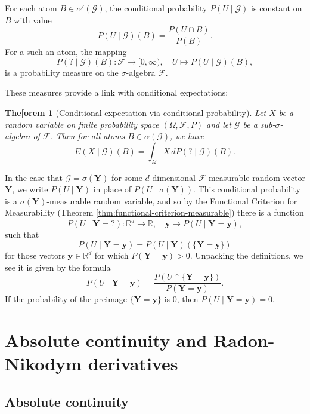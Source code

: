 \documentclass[11pt]{book}
\newtheorem{thm}{The[orem}[section]
\theoremstyle{definition}
\numberwithin{equation}{section}
\begin{document}
For each atom $B\in \alpha'(\mathcal{G})$, the conditional probability $P(U\mid \mathcal{G})$ is constant on $B$ with value
\[
	P(U\mid \mathcal{G})(B) = \frac{P(U\cap B)}{P(B)}.
\]
For a such an atom, the mapping
\[
	P({?}\mid \mathcal{G})(B): \mathcal{F} \to [0, \infty), \quad U \mapsto P(U\mid \mathcal{G})(B),
\]
is a probability measure on the $\sigma$-algebra $\mathcal{F}$.

These measures provide a link with conditional expectations:

\begin{thm}[Conditional expectation via conditional probability]\label{thm:cond-exp-familiar}
	Let $X$ be a random variable on finite probability space $(\Omega, \mathcal{F}, P)$ and let $\mathcal{G}$ be a sub-$\sigma$-algebra of $\mathcal{F}$. Then for all atoms $B\in \alpha(\mathcal{G})$, we have
	\[
		E(X \mid \mathcal{G})(B) = \int_\Omega X \, dP({?} \mid \mathcal{G})(B).
	\]
\end{thm}

In the case that $\mathcal{G} = \sigma(\mathbf{Y})$ for some $d$-dimensional $\mathcal{F}$-measurable random vector $\mathbf{Y}$, we write $P(U \mid \mathbf{Y})$ in place of $P(U \mid \sigma(\mathbf{Y}))$. This conditional probability is a $\sigma(\mathbf{Y})$-measurable random variable, and so by the Functional Criterion for Measurability (Theorem \ref{thm:functional-criterion-measurable}) there is a function
\[
	P(U \mid \mathbf{Y} = {?}): \mathbb{R}^d \to \mathbb{R}, \quad \mathbf{y} \mapsto P(U \mid \mathbf{Y} = \mathbf{y}),
\]
such that
\[
	P(U \mid \mathbf{Y} = \mathbf{y}) = P(U \mid \mathbf{Y})(\{\mathbf{Y} = \mathbf{y}\})
\]
for those vectors $\mathbf{y}\in \mathbb{R}^d$ for which $P(\mathbf{Y} = \mathbf{y})>0$. Unpacking the definitions, we see it is given by the formula
\[
	P(U \mid \mathbf{Y} = \mathbf{y}) = \frac{P\left(U \cap \{\mathbf{Y} = \mathbf{y}\} \right)}{P(\mathbf{Y} = \mathbf{y})}.
\]
If the probability of the preimage $\{\mathbf{Y}=\mathbf{y}\}$ is $0$, then $P(U \mid \mathbf{Y} = \mathbf{y})=0$.

\section{Absolute continuity and Radon-Nikodym derivatives}

\subsection{Absolute continuity}
\end{document}
